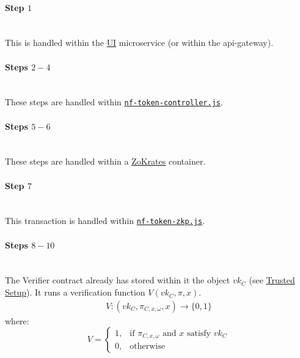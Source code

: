 \documentclass{article}
\begin{document}
\paragraph{Step $1$}
\ \\
This is handled within the \hyperref[sec:ui]{UI} microservice (or within the api-gateway).

\paragraph{Steps $2 - 4$}
\ \\
These steps are handled within \hyperref[sec:nf-token-controller]{\texttt{nf-token-controller.js}}.

\paragraph{Steps $5 - 6$}
\ \\
These steps are handled within a \hyperref[sec:zokrates]{ZoKrates} container.

\paragraph{Step $7$}
\ \\
This transaction is handled within \hyperref[sec:nf-token-zkp]{\texttt{nf-token-zkp.js}}.

\paragraph{Steps $8 - 10$}
\ \\
The Verifier contract already has stored within it the object $vk_C$ (see \hyperref[sec:trustedSetup]{Trusted Setup}). It runs a verification function $V(vk_C, \pi , x)$.
\begin{align*}
  V: (vk_C, \pi_{C,x,\omega}, x) \to \{0,1\}
\end{align*}
where:
\[
    V=
\begin{cases}
    1,& \text{if } \pi_{C,x,\omega} \text{ and } x \text{ satisfy } vk_C\\
    0,& \text{otherwise}
\end{cases}
\]
\end{document}

